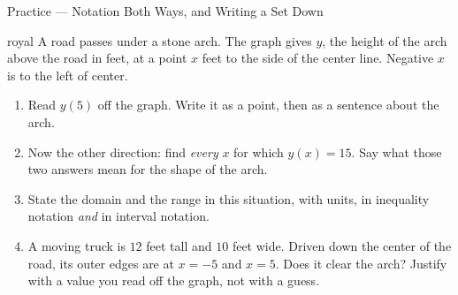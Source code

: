 \documentclass[10pt]{article}
\begin{document}
\begin{notesbox}{Practice --- Notation Both Ways, and Writing a Set Down}
\begin{enumerate}[leftmargin=1.6em, itemsep=6pt, topsep=4pt]

\end{enumerate}
\end{notesbox}

\vspace{0.10in}

\boxguard[30]
\begin{scenariobox}{royal}
\small
A road passes under a stone arch. The graph gives $y$, the height of the arch above the road in
feet, at a point $x$ feet to the side of the center line. Negative $x$ is to the left of center.

\begin{center}
\end{center}

\begin{enumerate}[leftmargin=1.6em, itemsep=6pt, topsep=2pt, start=6]

\item Read $y(5)$ off the graph. Write it as a point, then as a sentence about the arch.


\item Now the other direction: find \emph{every} $x$ for which $y(x)=15$. Say what those two
answers mean for the shape of the arch.


\item State the domain and the range in this situation, with units, in inequality notation
\emph{and} in interval notation.


\item A moving truck is $12$ feet tall and $10$ feet wide. Driven down the center of the road, its
outer edges are at $x=-5$ and $x=5$. Does it clear the arch? Justify with a value you read off the
graph, not with a guess.


\end{enumerate}
\end{scenariobox}
\end{document}
